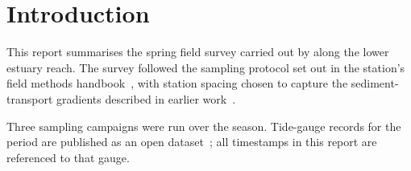 \section{Introduction}

This report summarises the spring field survey carried out by
\orgname{} along the lower estuary reach. The survey followed the
sampling protocol set out in the station's field methods
handbook~\cite{handbook2021}, with station spacing chosen to capture
the sediment-transport gradients described in earlier
work~\cite{rivers2023}.

Three sampling campaigns were run over the season. Tide-gauge records
for the period are published as an open dataset~\cite{tidesdataset};
all timestamps in this report are referenced to that gauge.
